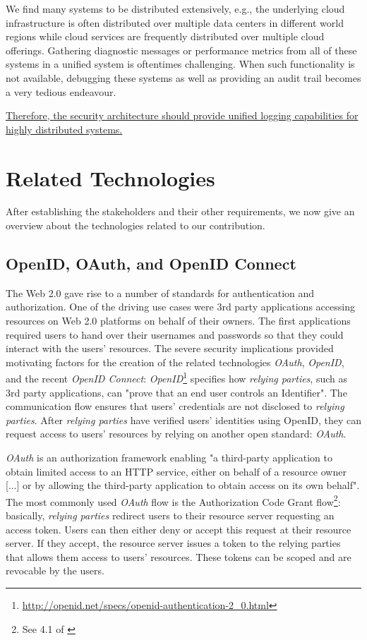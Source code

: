 \documentclass{llncs}
\begin{document}
We find many systems to be distributed extensively, e.g., the underlying cloud infrastructure is often distributed over multiple data centers in different world regions while cloud services are frequently distributed over multiple cloud offerings. Gathering diagnostic messages or performance metrics from all of these systems in a unified system is oftentimes challenging. When such functionality is not available, debugging these systems as well as providing an audit trail becomes a very tedious endeavour.

\ul{Therefore, the security architecture should provide unified logging capabilities for highly distributed systems.}

\section{Related Technologies}
\label{sec:related-work}

After establishing the stakeholders and their other requirements, we now give an overview about the technologies related to our contribution.

\subsection{OpenID, OAuth, and OpenID Connect}

The Web 2.0 gave rise to a number of standards for authentication and authorization. One of the driving use cases were 3rd party applications accessing resources on Web 2.0 platforms on behalf of their owners. The first applications required users to hand over their usernames and passwords so that they could interact with the users' resources. The severe security implications provided motivating factors for the creation of the related technologies \textit{OAuth}, \textit{OpenID}, and the recent \textit{OpenID Connect}: \textit{OpenID}\footnote{\url{http://openid.net/specs/openid-authentication-2\_0.html}} specifies how \textit{relying parties}, such as 3rd party applications, can "prove that an end user controls an Identifier". The communication flow ensures that users' credentials are not disclosed to \textit{relying parties}. After \textit{relying parties} have verified users' identities using OpenID, they can request access to users' resources by relying on another open standard: \textit{OAuth}\cite{RFC6749}.

\textit{OAuth} is an authorization framework enabling "a third-party application to obtain limited access to an HTTP service, either on behalf of a resource owner [...] or by allowing the third-party application to obtain access on its own behalf". The most commonly used \textit{OAuth} flow is the Authorization Code Grant flow\footnote{See 4.1 of \cite{RFC6749}}: basically, \textit{relying parties} redirect users to their resource server requesting an access token. Users can then either deny or accept this request at their resource server. If they accept, the resource server issues a token to the relying parties that allows them access to users' resources. These tokens can be scoped and are revocable by the users.
\end{document}
